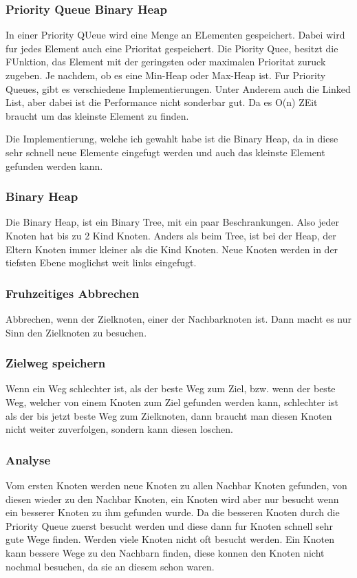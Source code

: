 \documentclass[a4paper,12pt,arial]{scrartcl}
\begin{document}
\subsubsection{Priority Queue Binary Heap}
In einer Priority QUeue wird eine Menge an ELementen gespeichert. Dabei wird fur jedes Element auch eine Prioritat gespeichert.
Die Piority Quee, besitzt die FUnktion, das Element mit der geringsten oder maximalen Prioritat zuruck zugeben. Je nachdem, ob es eine Min-Heap oder Max-Heap ist.
Fur Priority Queues, gibt es verschiedene Implementierungen. Unter Anderem auch die Linked List, aber dabei ist die Performance nicht sonderbar gut. Da es O(n) ZEit braucht um das kleinste Element zu finden.
\textcite{skienaPriorityQueue}

Die Implementierung, welche ich gewahlt habe ist die Binary Heap, da in diese sehr schnell neue Elemente eingefugt werden und auch das kleinste Element gefunden werden kann.

\subsubsection{Binary Heap}
Die Binary Heap, ist ein Binary Tree, mit ein paar Beschrankungen.
Also jeder Knoten hat bis zu 2 Kind Knoten.
Anders als beim Tree, ist bei der Heap, der Eltern Knoten immer kleiner als die Kind Knoten.
Neue Knoten werden in der tiefsten Ebene moglichst weit links eingefugt.


\subsubsection{Fruhzeitiges Abbrechen}
Abbrechen, wenn der Zielknoten, einer der Nachbarknoten ist. Dann macht es nur Sinn den Zielknoten zu besuchen.

\subsubsection{Zielweg speichern}
Wenn ein Weg schlechter ist, als der beste Weg zum Ziel, bzw. wenn der beste Weg, welcher von einem Knoten zum Ziel gefunden werden kann, schlechter ist als der bis jetzt beste Weg zum Zielknoten, dann braucht man diesen Knoten nicht weiter zuverfolgen, sondern kann diesen loschen.

 
\subsubsection{Analyse}
Vom ersten Knoten werden neue Knoten zu allen Nachbar Knoten gefunden, von diesen wieder zu den Nachbar Knoten, ein Knoten wird aber nur besucht wenn ein besserer Knoten zu ihm gefunden wurde. Da die besseren Knoten durch die Priority Queue zuerst besucht werden und diese dann fur Knoten schnell sehr gute Wege finden. Werden viele Knoten nicht oft besucht werden. Ein Knoten kann bessere Wege zu den Nachbarn finden, diese konnen den Knoten nicht nochmal besuchen, da sie an diesem schon waren.
\end{document}
